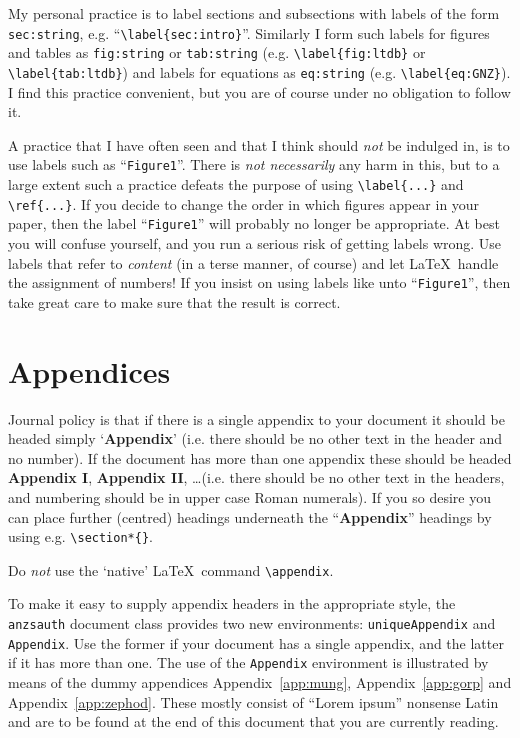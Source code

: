 \documentclass[times, doublespace]{anzsauth}
\begin{document}
My personal practice is to label sections and subsections with labels
of the form \texttt{sec:string}, e.g. ``\verb!\label{sec:intro}!''.
Similarly I form such labels for figures and tables
as \texttt{fig:string} or \texttt{tab:string} (e.g.
\verb!\label{fig:ltdb}! or \verb!\label{tab:ltdb}!) and labels
for equations as \texttt{eq:string} (e.g. \verb!\label{eq:GNZ}!).
I find this practice convenient, but you are of course under no
obligation to follow it.

A practice that I have often seen and that I think should \emph{not}
be indulged in, is to use labels such as ``\texttt{Figure1}''.  There
is \emph{not necessarily} any harm in this, but to a large extent
such a practice defeats the purpose of using \verb!\label{...}! and
\verb!\ref{...}!.  If you decide to change the order in which
figures appear in your paper, then the label ``\texttt{Figure1}''
will probably no longer be appropriate.  At best you will confuse
yourself, and you run a serious risk of getting labels wrong.
Use labels that refer to \emph{content} (in a terse manner, of
course) and let \LaTeX\ handle the assignment of numbers!  If you
insist on using labels like unto ``\texttt{Figure1}'',
then take great care to make sure that the result is correct.

\section{Appendices}
\label{sec:append}

Journal policy is that if there is a single appendix to your document
it should be headed simply `\textbf{Appendix}' (i.e. there should
be no other text in the header and no number).  If the document
has more than one appendix these should be headed \textbf{Appendix
I}, \textbf{Appendix II}, \ldots (i.e. there should be no
other text in the headers, and numbering should be in upper case
Roman numerals).  If you so desire you can place further (centred)
headings underneath the ``\textbf{Appendix}'' headings by using e.g.
\verb!\section*{}!.

Do \emph{not} use the `native' \LaTeX\ command \verb!\appendix!.

To make it easy to supply appendix headers in the appropriate style,
the \texttt{anzsauth} document class provides two new environments:
\texttt{uniqueAppendix} and \texttt{Appendix}.  Use the former
if your document has a single appendix, and the latter if it has
more than one.  The use of the \texttt{Appendix} environment is
illustrated by means of the dummy appendices Appendix~\ref{app:mung},
Appendix~\ref{app:gorp} and Appendix~\ref{app:zephod}.  These mostly
consist of ``Lorem ipsum'' nonsense Latin and are to be found at
the end of this document that you are currently reading.
\end{document}
